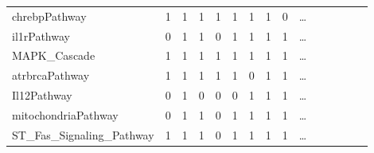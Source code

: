 \documentclass{scrartcl}
\numberwithin{figure}{section}
\numberwithin{table}{section}
\begin{document}
\begin{table}[h!]
\begin{tabular}{lllllllllllllll}
    chrebpPathway                                    & 1            & 1           & 1               & 1          & 1            & 1            & 1            & 0 & \dots \\
    il1rPathway                                      & 0            & 1           & 1               & 0          & 1            & 1            & 1            & 1 & \dots \\
    MAPK\_Cascade                                    & 1            & 1           & 1               & 1          & 1            & 1            & 1            & 1 & \dots \\
    atrbrcaPathway                                   & 1            & 1           & 1               & 1          & 1            & 0            & 1            & 1 & \dots \\
    Il12Pathway                                      & 0            & 1           & 0               & 0          & 0            & 1            & 1            & 1 & \dots \\
    mitochondriaPathway                              & 0            & 1           & 1               & 0          & 1            & 1            & 1            & 1 & \dots \\
    ST\_Fas\_Signaling\_Pathway                      & 1            & 1           & 1               & 0          & 1            & 1            & 1            & 1 & \dots \\
    \bottomrule
  \end{tabular}
\end{table}
\end{document}
